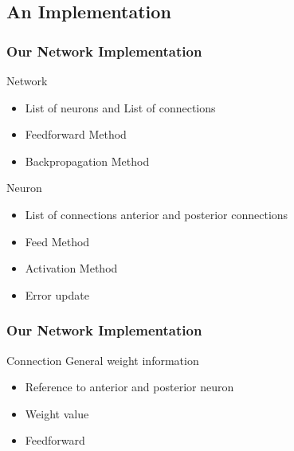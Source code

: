 \documentclass{beamer}
\begin{document}
\subsection{An Implementation}
\begin{frame}
\frametitle{Our Network Implementation}
\begin{block}{Network}
    \begin{itemize}
        \item List of neurons and List of connections
        \item Feedforward Method
        \item Backpropagation Method
    \end{itemize}
\end{block}

\begin{block}{Neuron}
    \begin{itemize}
        \item List of connections anterior and posterior connections
        \item Feed Method
        \item Activation Method
        \item Error update
    \end{itemize}
\end{block}
\end{frame}


\begin{frame}
\frametitle{Our Network Implementation}
\begin{block}{Connection}
    General weight information
    \begin{itemize}
        \item Reference to anterior and posterior neuron
        \item Weight value
        \item Feedforward
    \end{itemize}
\end{block}
\end{frame}
\end{document}
